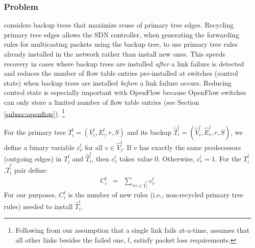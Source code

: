 \subsubsection{\mcn Problem}
\label{subsubsec:min-control}


\mc considers backup trees that maximize reuse of primary tree edges.  Recycling primary tree edges allows the SDN controller, when generating the forwarding rules for multicasting 
packets using the backup tree, to use primary tree rules already installed in the network rather than install new ones.
This speeds recovery in cases where backup trees are installed \emph{after} a link failure is detected and reduces the number of flow table entries pre-installed at switches (control state) 
when backup trees are installed \emph{before} a link failure occurs.  
Reducing control state is especially important with OpenFlow because OpenFlow switches can only store a limited number of flow table entries (see Section \ref{subsec:openflow}).
\footnote{Following from our assumption that a single link fails at-a-time, \mc assumes that all other links besides the failed one, $l$, satisfy packet loss requirements. }

For the primary tree $T^l_i = (V^l_i,E^l_i,r,S)$ and its backup $\hat{T}^l_i=(\hat{V}^l_i,\hat{E}^l_i,r,S)$, we define a binary variable $c_v^l$ for all $v \in \hat{V}_i^l$. 
If $v$ has exactly the same predecessors (outgoing edges) in $T^l_i$ and $\hat{T}^l_i$, then $c_v^l$ takes value $0$.  Otherwise, $c_v^l=1$.  
For the $T^l_i$,$\hat{T}^l_i$ pair define:
\begin{eqnarray}
\label{eqn:control-overhead}
 C_i^l &=&  \sum_{\forall v \in \hat{V}_i^l} c_v^l 
\end{eqnarray}
For our purposes, $C_i^l$ is the number of new rules (i.e., non-recycled primary tree rules) needed to install $\hat{T}^l_i$.

